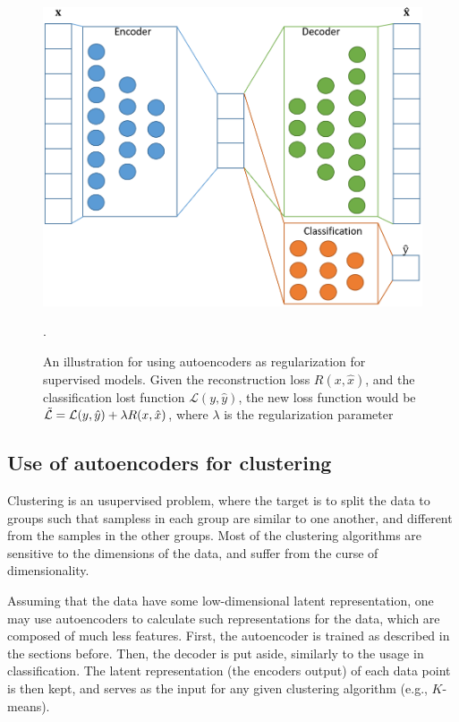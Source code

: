 \documentclass[graybox]{svmult}
\begin{document}
\begin{figure}
    \centering
    \includegraphics[scale=0.5]{ae_regularization.png}
    \caption{An illustration for using autoencoders as regularization for supervised models. Given the reconstruction loss $R(x,\hat{x})$, and the classification lost function $\mathcal{L}(y,\hat{y})$, the new loss function would be $\Tilde{\mathcal{L}}=\mathcal{L}(y,\hat{y})+\lambda R(x,\hat{x})$, where $\lambda$ is the regularization parameter}.
    \label{fig:supervised_autoencoders}
\end{figure}

\subsection{Use of autoencoders for clustering}
Clustering is an usupervised problem, where the target is to split the data to groups such that sampless in each group are similar to one another, and different from the samples in the other groups. Most of the clustering algorithms are sensitive to the dimensions of the data, and suffer from the curse of dimensionality. 

Assuming that the data have some low-dimensional latent representation, one may use autoencoders to calculate such representations for the data,  which are composed of much less features. First, the autoencoder is trained as described in the sections before. Then, the decoder is put aside, similarly to the usage in classification. The latent representation (the encoders output) of each data point is then kept, and serves as the input for any given clustering algorithm (e.g., $K$-means).
\end{document}
